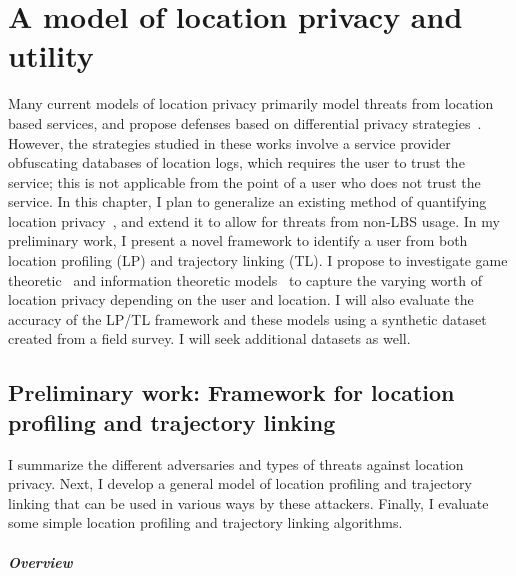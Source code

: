 \chapter{A model of location privacy and utility}
\label{ch1}

Many current models of location privacy primarily model threats from location based services, and propose defenses based on differential privacy strategies~\cite{andres2013geo,ho2011differential}.
However, the strategies studied in these works involve a service provider obfuscating databases of location logs, which requires the user to trust the service; this is not applicable from the point of a user who does not trust the service. 
In this chapter, I plan to generalize an existing method of quantifying location privacy~\cite{shokri2011quantifying}, and extend it to allow for threats from non-LBS usage. In my preliminary work, I present a novel framework to identify a user from both location profiling (LP) and trajectory linking (TL).
I propose to investigate game theoretic~\cite{freudiger2009non} and information theoretic models~\cite{sankar2013utility} to capture the varying worth of location privacy depending on the user and location. I will also evaluate the accuracy of the LP/TL framework and these models using a synthetic dataset created from a field survey. I will seek additional datasets as well.

\section{Preliminary work: Framework for location profiling and trajectory linking}
I summarize the different adversaries and types of threats against location privacy. Next, I develop a general model of location profiling and trajectory linking that can be used in various ways by these attackers. Finally, I evaluate some simple location profiling and trajectory linking algorithms.

\paragraph*{Overview}

